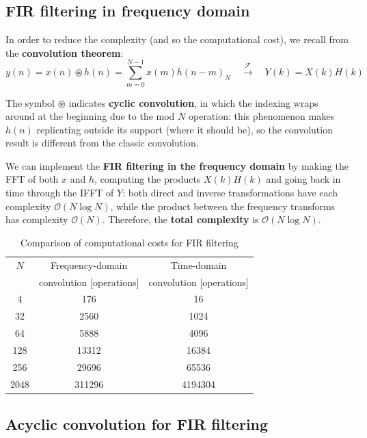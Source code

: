 \subsection{FIR filtering in frequency domain}

In order to reduce the complexity (and so the computational cost), we recall from the \textbf{convolution theorem}:
\[ y(n) = x(n) \circledast h(n) = \sum_{m=0}^{N-1} x(m) h(n-m)_N \quad \overset{\mathcal{F}}{\longrightarrow} \quad Y(k) = X(k) H(k) \]

The symbol $\circledast$ indicates \textbf{cyclic convolution}, in which the indexing wraps around at the beginning due to the mod $N$ operation: this phenomenon makes $h(n)$ replicating outside its support (where it should be), so the convolution result is different from the classic convolution.

We can implement the \textbf{FIR filtering in the frequency domain} by making the FFT of both $x$ and $h$, computing the products $X(k) H(k)$ and going back in time through the IFFT of $Y$: both direct and inverse transformations have each complexity $\mathcal{O}(N \log N)$, while the product between the frequency transforms has complexity $\mathcal{O}(N)$.
Therefore, the \textbf{total complexity} is $\mathcal{O}(N \log N)$.
\begin{table}[H]
    \centering
    \begin{tabular}{ccc}
        \toprule
        $N$ & Frequency-domain & Time-domain \\[3pt]
        [samples] & convolution [operations] & convolution [operations] \\
        \midrule
        4 & 176 & 16 \\
        32 & 2560 & 1024 \\
        64 & 5888 & 4096 \\
        128 & 13312 & 16384 \\
        256 & 29696 & 65536 \\
        2048 & 311296 & 4194304 \\
        \bottomrule
    \end{tabular}
    \caption{Comparison of computational costs for FIR filtering}
\end{table}


\subsection{Acyclic convolution for FIR filtering}

